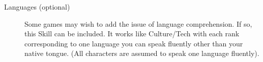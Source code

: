 \begin{description}
\item[Languages (optional)]
Some games may wish to add the issue of language comprehension. If so, this Skill can be included. It works like Culture/Tech with each rank corresponding to one language you can speak fluently other than your native tongue. (All characters are assumed to speak one language fluently).
\end{description}

